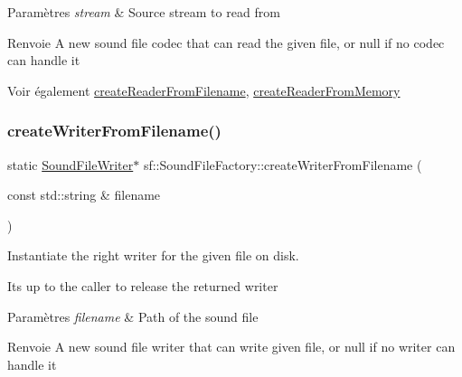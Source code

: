 \begin{DoxyParams}{Paramètres}
{\em stream} & Source stream to read from\\
\hline
\end{DoxyParams}
\begin{DoxyReturn}{Renvoie}
A new sound file codec that can read the given file, or null if no codec can handle it
\end{DoxyReturn}
\begin{DoxySeeAlso}{Voir également}
\hyperlink{classsf_1_1SoundFileFactory_af0a87110e0b8a77aada17b22a016c066}{create\+Reader\+From\+Filename}, \hyperlink{classsf_1_1SoundFileFactory_aee7a0ff1eace98d5325eaadc7d26d50c}{create\+Reader\+From\+Memory} 
\end{DoxySeeAlso}
\mbox{\label{classsf_1_1SoundFileFactory_a0702eb2e8a4a171ba80c7fbd04c4defc}} 
\subsubsection{\texorpdfstring{create\+Writer\+From\+Filename()}{createWriterFromFilename()}}
{\footnotesize\ttfamily static \hyperlink{classsf_1_1SoundFileWriter}{Sound\+File\+Writer}$\ast$ sf\+::\+Sound\+File\+Factory\+::create\+Writer\+From\+Filename (\begin{DoxyParamCaption}\item[{const std\+::string \&}]{filename }\end{DoxyParamCaption})\hspace{0.3cm}{\ttfamily [static]}}



Instantiate the right writer for the given file on disk. 

It\textquotesingle{}s up to the caller to release the returned writer


\begin{DoxyParams}{Paramètres}
{\em filename} & Path of the sound file\\
\hline
\end{DoxyParams}
\begin{DoxyReturn}{Renvoie}
A new sound file writer that can write given file, or null if no writer can handle it 
\end{DoxyReturn}
\mbox{\label{classsf_1_1SoundFileFactory_acaf1f0bf1b7c7b9988ec76b33e33fe95}} 
